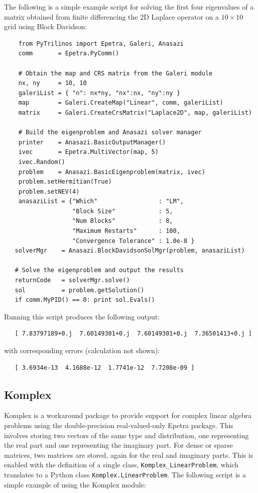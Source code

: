 \documentclass[11pt]{article}
\begin{document}
The following is a simple example script for solving the first four eigenvalues of a matrix obtained from finite differencing the 2D Laplace operator on a $10\times10$ grid using Block Davidson:
\begin{verbatim}
    from PyTrilinos import Epetra, Galeri, Anasazi
    comm       = Epetra.PyComm()
    
    # Obtain the map and CRS matrix from the Galeri module
    nx, ny     = 10, 10
    galeriList = { "n": nx*ny, "nx":nx, "ny":ny }
    map        = Galeri.CreateMap("Linear", comm, galeriList)
    matrix     = Galeri.CreateCrsMatrix("Laplace2D", map, galeriList)
    
    # Build the eigenproblem and Anasazi solver manager
    printer    = Anasazi.BasicOutputManager()
    ivec       = Epetra.MultiVector(map, 5)
    ivec.Random()
    problem    = Anasazi.BasicEigenproblem(matrix, ivec)
    problem.setHermitian(True)
    problem.setNEV(4)
    anasaziList = {"Which"                 : "LM",
                   "Block Size"            : 5,
                   "Num Blocks"            : 8,
                   "Maximum Restarts"      : 100,
                   "Convergence Tolerance" : 1.0e-8 }
   solverMgr    = Anasazi.BlockDavidsonSolMgr(problem, anasaziList)
   
   # Solve the eigenproblem and output the results
   returnCode   = solverMgr.solve()
   sol          = problem.getSolution()
   if comm.MyPID() == 0: print sol.Evals()
\end{verbatim}
Running this script produces the following output:
\begin{verbatim}
   [ 7.83797189+0.j  7.60149301+0.j  7.60149301+0.j  7.36501413+0.j ]
\end{verbatim}
with corresponding errors (calculation not shown):
\begin{verbatim}
   [ 3.6934e-13  4.1688e-12  1.7741e-12  7.7208e-09 ]
\end{verbatim}

\subsection{Komplex}
\label{sec:komplex}

Komplex is a workaround package to provide support for complex linear algebra problems using the double-precision real-valued-only Epetra package.  This involves storing two vectors of the same type and distribution, one representing the real part and one representing the imaginary part.  For dense or sparse matrices, two matrices are stored, again for the real and imaginary parts.  This is enabled with the definition of a single class, {\tt Komplex\_LinearProblem}, which translates to a Python class {\tt Komplex.LinearProblem}.  The following script is a simple example of using the Komplex module:
\end{document}
